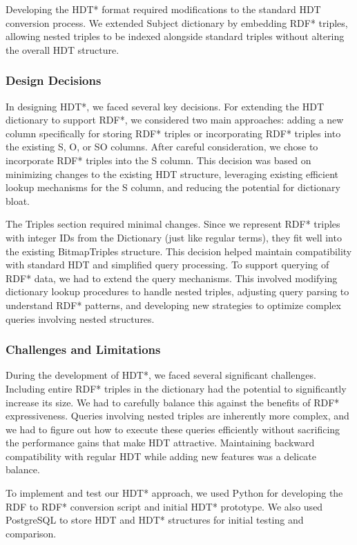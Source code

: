 Developing the HDT* format required modifications to the standard HDT conversion process. We extended Subject dictionary by embedding RDF* triples, allowing nested triples to be indexed alongside standard triples without altering the overall HDT structure.

\subsubsection{Design Decisions}

In designing HDT*, we faced several key decisions. For extending the HDT dictionary to support RDF*, we considered two main approaches: adding a new column specifically for storing RDF* triples or incorporating RDF* triples into the existing S, O, or SO columns. After careful consideration, we chose to incorporate RDF* triples into the S column. This decision was based on minimizing changes to the existing HDT structure, leveraging existing efficient lookup mechanisms for the S column, and reducing the potential for dictionary bloat.

The Triples section required minimal changes. Since we represent RDF* triples with integer IDs from the Dictionary (just like regular terms), they fit well into the existing BitmapTriples structure. This decision helped maintain compatibility with standard HDT and simplified query processing. To support querying of RDF* data, we had to extend the query mechanisms. This involved modifying dictionary lookup procedures to handle nested triples, adjusting query parsing to understand RDF* patterns, and developing new strategies to optimize complex queries involving nested structures.

\subsubsection{Challenges and Limitations}

During the development of HDT*, we faced several significant challenges. Including entire RDF* triples in the dictionary had the potential to significantly increase its size. We had to carefully balance this against the benefits of RDF* expressiveness. Queries involving nested triples are inherently more complex, and we had to figure out how to execute these queries efficiently without sacrificing the performance gains that make HDT attractive. Maintaining backward compatibility with regular HDT while adding new features was a delicate balance.

To implement and test our HDT* approach, we used Python for developing the RDF to RDF* conversion script and initial HDT* prototype. We also used PostgreSQL to store HDT and HDT* structures for initial testing and comparison.

